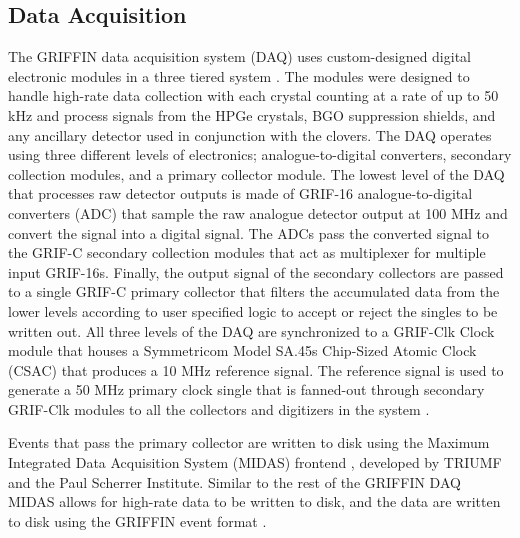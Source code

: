\documentclass[cnatzke_thesis_proposal.tex]{subfiles}
\begin{document}
\subsection{Data Acquisition}
The GRIFFIN data acquisition system (DAQ) uses custom-designed digital electronic modules in a three tiered system \cite{garnsworthy_griffin_2017}. 
The modules were designed to handle high-rate data collection with each crystal counting at a rate of up to 50 kHz and process signals from the HPGe crystals, BGO suppression shields, and any ancillary detector used in conjunction with the clovers. 
The DAQ operates using three different levels of electronics; analogue-to-digital converters, secondary collection modules, and a primary collector module. The lowest level of the DAQ that processes raw detector outputs is made of GRIF-16 analogue-to-digital converters (ADC) that sample the raw analogue detector output at 100 MHz and convert the signal into a digital signal.
The ADCs pass the converted signal to the GRIF-C secondary collection modules that act as multiplexer for multiple input GRIF-16s. 
Finally, the output signal of the secondary collectors are passed to a single GRIF-C primary collector that filters the accumulated data from the lower levels according to user specified logic to accept or reject the singles to be written out. 
All three levels of the DAQ are synchronized to a GRIF-Clk Clock module that houses a Symmetricom Model SA.45s Chip-Sized Atomic Clock (CSAC) that produces a 10 MHz reference signal. 
The reference signal is used to generate a 50 MHz primary clock single that is fanned-out through secondary GRIF-Clk modules to all the collectors and digitizers in the system \cite{garnsworthy_griffin_2017}.

Events that pass the primary collector are written to disk using the Maximum Integrated Data Acquisition System (MIDAS) frontend \cite{ritt_midas_1997}, developed by TRIUMF and the Paul Scherrer Institute. 
Similar to the rest of the GRIFFIN DAQ MIDAS allows for high-rate data to be written to disk, and the data are written to disk using the GRIFFIN event format \cite{griffin_griffin_nodate}. 

\end{document}
